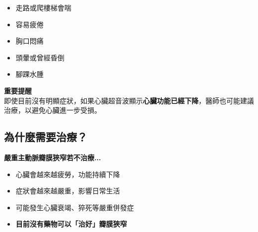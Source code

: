 \documentclass[12pt,a4paper]{article}
\begin{document}
\begin{minipage}[t]{0.48\textwidth}
\begin{checklistbox}[您是否有這些症狀？]
\begin{itemize}[leftmargin=*, itemsep=5pt]
    \item[$\square$] 走路或爬樓梯會喘
    \item[$\square$] 容易疲倦
    \item[$\square$] 胸口悶痛
    \item[$\square$] 頭暈或曾經昏倒
    \item[$\square$] 腳踝水腫
\end{itemize}
\end{checklistbox}
\end{minipage}
\hfill
\begin{minipage}[t]{0.48\textwidth}
\begin{tcolorbox}[colback=red!5, colframe=emergency_red, arc=8pt]
\textbf{\textcolor{emergency_red}{重要提醒}}\\[0.3cm]
即使目前沒有明顯症狀，如果心臟超音波顯示\textbf{心臟功能已經下降}，醫師也可能建議治療，以避免心臟進一步受損。
\end{tcolorbox}
\end{minipage}

\vspace{0.8cm}

\subsection*{\textcolor{emergency_blue}{為什麼需要治療？}}

\begin{center}
\begin{tcolorbox}[colback=yellow!10, colframe=pda_orange, width=0.9\textwidth, arc=8pt]
\begin{center}
{\large\bfseries 嚴重主動脈瓣膜狹窄若不治療...}\\[0.5cm]
\end{center}
\begin{itemize}[leftmargin=2cm, itemsep=8pt]
    \item 心臟會越來越疲勞，功能持續下降
    \item 症狀會越來越嚴重，影響日常生活
    \item 可能發生心臟衰竭、猝死等嚴重併發症
    \item \textbf{目前沒有藥物可以「治好」瓣膜狹窄}
\end{itemize}
\end{tcolorbox}
\end{center}
\end{document}

